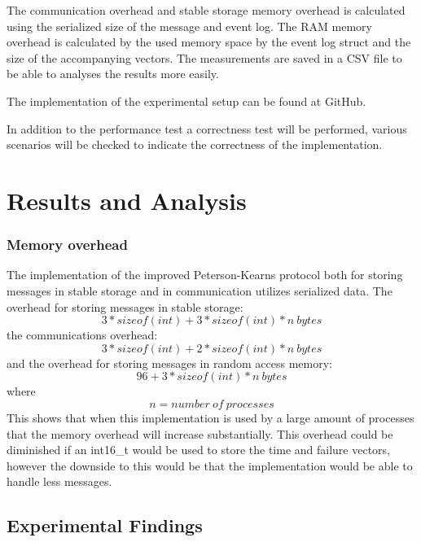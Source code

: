 \documentclass[twocolumn, a4paper,11pt]{article}%
\begin{document}
The communication overhead and stable storage memory overhead is calculated using the serialized size of the message and event log. The RAM memory overhead is calculated by the used memory space by the event log struct and the size of the accompanying vectors.
The measurements are saved in a CSV file to be able to analyses the results more easily. 
\par The implementation of the experimental setup can be found at GitHub\cite{implementation}.
\par In addition to the performance test a correctness test will be performed, various scenarios will be checked to indicate the correctness of the implementation. 


\section{Results and Analysis}
\subsubsection{Memory overhead}
\par The implementation of the improved Peterson-Kearns protocol both for storing messages in stable storage and in communication utilizes serialized data. The overhead for storing messages in stable storage:\[3*sizeof(int) + 3*sizeof(int)*n\ bytes\]the communications overhead:\[ 3*sizeof(int) + 2*sizeof(int)*n\ bytes\]and the overhead for storing messages in random access memory: \[96+3*sizeof(int)*n\ bytes\] where \[n = number\ of\ processes\] 
This shows that when this implementation is used by a large amount of processes that the memory overhead will increase substantially. This overhead could be diminished if an int16\_t would be used to store the time and failure vectors, however the downside to this would be that the implementation would be able to handle less messages.

\subsection{Experimental Findings}
\end{document}
